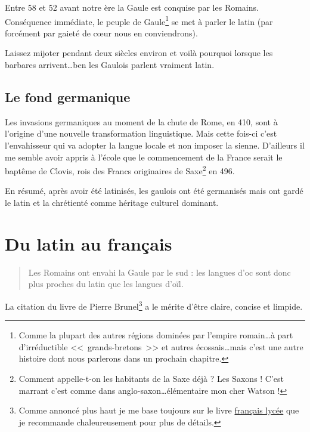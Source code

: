 Entre 58 et 52 avant notre ère la Gaule est conquise par les
Romains. Conséquence immédiate, le peuple de Gaule\footnote{Comme la
  plupart des autres régions dominées par l'empire romain\dots à part
  d'irréductible <<~grands-bretons~>> et autres écossais\dots mais
  c'est une autre histoire dont nous parlerons dans un prochain
  chapitre.} se met à parler le latin (par forcément par gaieté de
c{\oe}ur nous en conviendrons).\par

Laissez mijoter pendant deux siècles environ et voilà pourquoi lorsque
les barbares arrivent\dots ben les Gaulois parlent vraiment latin.

\subsection{Le fond germanique}\label{subsec:germ}

Les invasions germaniques au moment de la chute de Rome, en 410, sont
à l'origine d'une nouvelle transformation linguistique. Mais cette
fois-ci c'est l'envahisseur qui va adopter la langue locale et non
imposer la sienne. D'ailleurs il me semble avoir appris à l'école que
le commencement de la France serait le baptême de Clovis, rois des
Francs originaires de Saxe\footnote{Comment appelle-t-on les habitants
de la Saxe déjà ? Les Saxons ! C'est marrant c'est comme dans
anglo-saxon\dots élémentaire mon cher Watson !} en 496.\par
En résumé, après avoir été latinisés, les gaulois ont été germanisés
mais ont gardé le latin et la chrétienté comme héritage culturel
dominant.

\section{Du latin au français}\label{sec:lat2fr}

\begin{quote}
  Les Romains ont envahi la Gaule par le sud : les langues d'oc sont
  donc plus proches du latin que les langues d'oïl.
\end{quote}

La citation du livre de Pierre Brunel\footnote{Comme annoncé plus haut
je me base toujours sur le livre \href{https://www.amazon.fr/gp/product/2844100015/ref=as\_li\_tl?ie=UTF8\&camp=1642\&creative=6746\&creativeASIN=2844100015\&linkCode=as2\&tag=wwwbecomefree-21\&linkId=985f3a849fd44728e8480993cf2d5490}{français
  lycée} que je recommande chaleureusement pour plus de détails.} a le
mérite d'être claire, concise et limpide.

